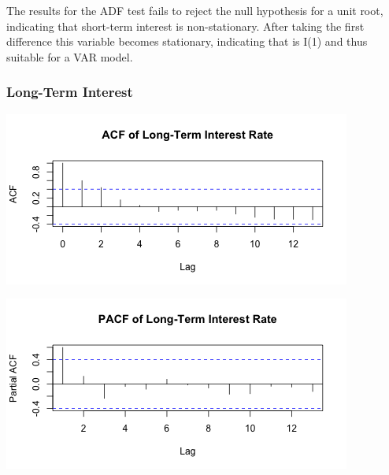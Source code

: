 \documentclass[11pt,preprint]{elsarticle}
\let\origfigure\figure
\let\endorigfigure\endfigure
\renewenvironment{figure}[1][2] {
    \expandafter\origfigure\expandafter[H]
} {
    \endorigfigure
}
\numberwithin{equation}{section}
\numberwithin{figure}{section}
\numberwithin{table}{section}
\begin{document}
The results for the ADF test fails to reject the null hypothesis for a
unit root, indicating that short-term interest is non-stationary. After
taking the first difference this variable becomes stationary, indicating
that is I(1) and thus suitable for a VAR model.

\subsubsection{Long-Term Interest}\label{long-term-interest}

\begin{figure}[H]

{\centering \includegraphics{DatSci-Project-_files/figure-latex/Figure14-1} 

}

\caption{Autocorrelation Function of Long-Term Interest Rate\label{Figure14}}\label{fig:Figure14}
\end{figure}

\begin{figure}[H]

{\centering \includegraphics{DatSci-Project-_files/figure-latex/Figure15-1} 

}

\caption{Partial Autocorrelation Function of Long-Term Interest Rate\label{Figure15}}\label{fig:Figure15}
\end{figure}
\end{document}
